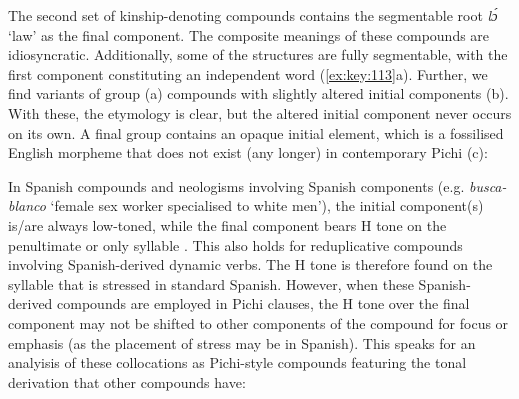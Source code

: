 The second set of kinship-denoting compounds contains the segmentable root \textit{lɔ́} ‘law’ as the final component. The composite meanings of these compounds are idiosyncratic. Additionally, some of the structures are fully segmentable, with the first component constituting an independent word (\ref{ex:key:113}a). Further, we find variants of group (a) compounds with slightly altered initial components (b). With these, the etymology is clear, but the altered initial component never occurs on its own. A final group contains an opaque initial element, which is a fossilised English morpheme that does not exist (any longer) in contemporary Pichi (c): 

In Spanish compounds and neologisms involving Spanish components (e.g. \textit{busca-blanco} ‘female sex worker specialised to white men’), the initial component(s) is/are always low-toned, while the final component bears H tone on the penultimate or only syllable . This also holds for reduplicative compounds involving Spanish-derived dynamic verbs. The H tone is therefore found on the syllable that is stressed in standard Spanish. However, when these Spanish-derived compounds are employed in Pichi clauses, the H tone over the final component may not be shifted to other components of the compound for focus or emphasis (as the placement of stress may be in Spanish). This speaks for an analyisis of these collocations as Pichi-style compounds featuring the tonal derivation that other compounds have:

